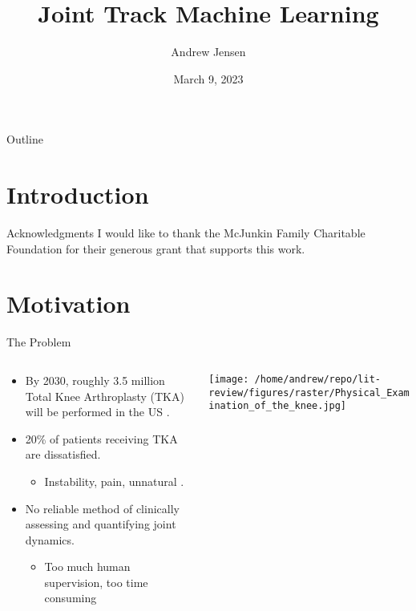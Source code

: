 \documentclass[presentation, aspectratio=1610]{beamer}
\author{Andrew Jensen}
\date{March 9, 2023}
\title{Joint Track Machine Learning}
\begin{document}
\maketitle
\begin{frame}{Outline}
\tableofcontents
\end{frame}


\section{Introduction}
\label{sec:orga9a763b}
\begin{frame}[label={sec:org753fa0f}]{Acknowledgments}
I would like to thank the McJunkin Family Charitable Foundation for their generous grant that supports this work.
\end{frame}
\section{Motivation}
\label{sec:org59522e1}
\begin{frame}[label={sec:org29b467a}]{The Problem}
\begin{columns}
\begin{column}{0.5\columnwidth}
\begin{itemize}
\item By 2030, roughly 3.5 million Total Knee Arthroplasty (TKA) will be performed in the US \autocite{kurtzProjectionsPrimaryRevision2007}.
\item 20\% of patients receiving TKA are dissatisfied.
\begin{itemize}
\item Instability, pain, unnatural \autocites{bakerRolePainFunction2007}[][]{bournePatientSatisfactionTotal2010}[][]{scottPredictingDissatisfactionFollowing2010}.
\end{itemize}
\item No reliable method of clinically assessing and quantifying joint dynamics.
\begin{itemize}
\item Too much human supervision, too time consuming
\end{itemize}
\end{itemize}
\end{column}
\begin{column}{0.5\columnwidth}
\begin{center}
\texttt{[image: /home/andrew/repo/lit-review/figures/raster/Physical\_Examination\_of\_the\_knee.jpg]}
\end{center}
\end{column}
\end{columns}
\end{frame}
\end{document}
